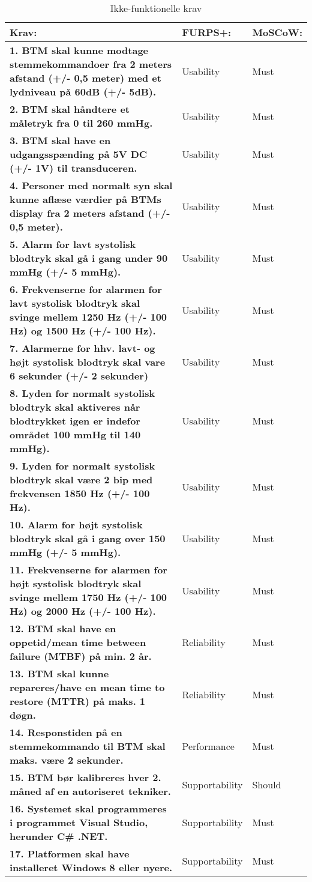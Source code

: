 \begin{table} [htbp]
\centering
\begin{tabular}{|p{10cm}|l|l|}
\hline
\textbf{Krav:} & \textbf{FURPS+:} & \textbf{MoSCoW:} \\ \hline
\textbf{1. BTM skal kunne modtage stemmekommandoer fra 2 meters afstand (+/- 0,5 meter) med et lydniveau på 60dB (+/- 5dB).} & Usability & Must \\ \hline
\textbf{2. BTM skal håndtere et måletryk fra 0 til 260 mmHg. }  & Usability & Must \\ \hline 
\textbf{3. BTM skal have en udgangsspænding på 5V DC (+/- 1V) til transduceren.} & Usability & Must \\ \hline
\textbf{4. Personer med normalt syn skal kunne aflæse værdier på BTMs display fra 2 meters afstand (+/- 0,5 meter). } & Usability & Must \\ \hline
\textbf{5. Alarm for lavt systolisk blodtryk skal gå i gang under 90 mmHg (+/- 5 mmHg).} & Usability & Must \\ \hline
\textbf{6. Frekvenserne for alarmen for lavt systolisk blodtryk skal svinge mellem 1250 Hz (+/- 100 Hz) og 1500 Hz (+/- 100 Hz).} & Usability & Must \\ \hline
\textbf{7. Alarmerne for hhv. lavt- og højt systolisk blodtryk skal vare 6 sekunder (+/- 2 sekunder)} & Usability & Must \\ \hline
\textbf{8. Lyden for normalt systolisk blodtryk skal aktiveres når blodtrykket igen er indefor området 100 mmHg til 140 mmHg).} & Usability & Must \\ \hline
\textbf{9. Lyden for normalt systolisk blodtryk skal være 2 bip med frekvensen 1850 Hz (+/- 100 Hz).} & Usability & Must \\ \hline
\textbf{10. Alarm for højt systolisk blodtryk skal gå i gang over 150 mmHg (+/- 5 mmHg).} & Usability & Must \\ \hline
\textbf{11. Frekvenserne for alarmen for højt systolisk blodtryk skal svinge mellem 1750 Hz (+/- 100 Hz) og 2000 Hz (+/- 100 Hz).} & Usability & Must \\ \hline
\textbf{12. BTM skal have en oppetid/mean time between failure (MTBF) på min. 2 år. } & Reliability & Must \\ \hline
\textbf{13. BTM skal kunne repareres/have en mean time to restore (MTTR) på maks. 1 døgn. } & Reliability & Must \\ \hline
\textbf{14. Responstiden på en stemmekommando til BTM skal maks. være 2 sekunder.} & Performance & Must \\ \hline
\textbf{15. BTM bør kalibreres hver 2. måned af en autoriseret tekniker. } & Supportability & Should \\ \hline
\textbf{16. Systemet skal programmeres i programmet Visual Studio, herunder C\# .NET.} & Supportability & Must \\ \hline
\textbf{17. Platformen skal have installeret Windows 8 eller nyere.} & Supportability & Must \\ \hline

\end{tabular}
\caption{Ikke-funktionelle krav}
\label{tb:ikkefunkkrav} 
\end{table}
